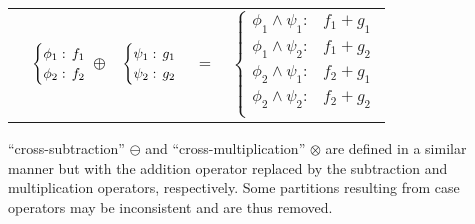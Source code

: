 {\small 
\begin{center}
  \begin{tabular}{r c c c l}
  &
    $\begin{cases}
        \phi_1: \hspace{-1mm} & \hspace{-1mm} f_1  \\ 
        \phi_2: \hspace{-1mm} & \hspace{-1mm} f_2  \\ 
    \end{cases}$
  $\oplus$
  &
  \hspace{-4mm}
    $\begin{cases}
        \psi_1: \hspace{-1mm} & \hspace{-1mm} g_1  \\ 
        \psi_2: \hspace{-1mm} & \hspace{-1mm} g_2  \\ 
    \end{cases}$
  &
  \hspace{-4mm} 
  $ = $
  &
  \hspace{-4mm}
    $\begin{cases}
      \phi_1 \wedge \psi_1: & f_1 + g_1 \\
      \phi_1 \wedge \psi_2: & f_1 + g_2 \\
      \phi_2 \wedge \psi_1: & f_2 + g_1 \\
      \phi_2 \wedge \psi_2: & f_2 + g_2  \\
    \end{cases}$
  \end{tabular}
\end{center}
}%

``cross-subtraction''  $\ominus$ and ``cross-multiplication'' $\otimes$
are defined in a similar manner but with the addition operator replaced
by the subtraction and multiplication operators, respectively.
Some partitions resulting from case operators may be inconsistent and 
are thus removed. 

